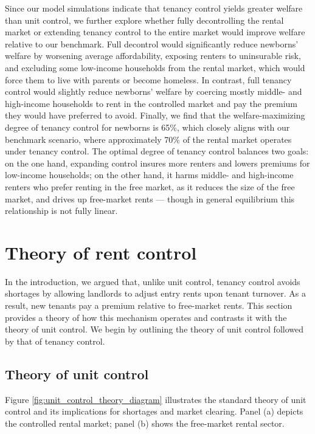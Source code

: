 \documentclass[parskip=full]{article}
\begin{document}
Since our model simulations indicate that tenancy control yields greater welfare than unit control, we further explore whether fully decontrolling the rental market or extending tenancy control to the entire market would improve welfare relative to our benchmark. Full decontrol would significantly reduce newborns' welfare by worsening average affordability, exposing renters to uninsurable risk, and excluding some low-income households from the rental market, which would force them to live with parents or become homeless. In contrast, full tenancy control would slightly reduce newborns' welfare by coercing mostly middle- and high-income households to rent in the controlled market and pay the premium they would have preferred to avoid. Finally, we find that the welfare-maximizing degree of tenancy control for newborns is 65\%, which closely aligns with our benchmark scenario, where approximately 70\% of the rental market operates under tenancy control. The optimal degree of tenancy control balances two goals: on the one hand, expanding control insures more renters and lowers premiums for low-income households; on the other hand, it harms middle- and high-income renters who prefer renting in the free market, as it reduces the size of the free market, and drives up free-market rents — though in general equilibrium this relationship is not fully linear.

\section{Theory of rent control}\label{sec:theory_uc_tc}

In the introduction, we argued that, unlike unit control, tenancy control avoids shortages by allowing landlords to adjust entry rents upon tenant turnover. As a result, new tenants pay a premium relative to free-market rents. This section provides a theory of how this mechanism operates and contrasts it with the theory of unit control. We begin by outlining the theory of unit control followed by that of tenancy control.

\subsection{Theory of unit control}

Figure \ref{fig:unit_control_theory_diagram} illustrates the standard theory of unit control and its implications for shortages and market clearing. Panel (a) depicts the controlled rental market; panel (b) shows the free-market rental sector.
\end{document}

